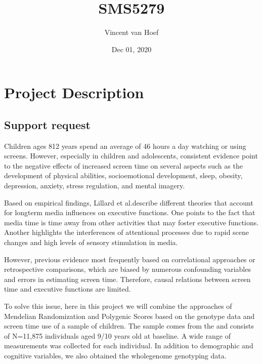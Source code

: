 \documentclass[letterpaper,10pt,english]{sphinxmanual}
\title{SMS5279}
\date{Dec 01, 2020}
\author{Vincent van Hoef}
\begin{document}
\pagestyle{empty}
\sphinxmaketitle
\pagestyle{plain}
\sphinxtableofcontents
\pagestyle{normal}
\label{\detokenize{index::doc}}


\begin{DUlineblock}{0em}
\item[] 
\end{DUlineblock}




\chapter{Project Description}
\label{\detokenize{content/project_description:project-description}}\label{\detokenize{content/project_description::doc}}

\section{Support request}
\label{\detokenize{content/project_description:support-request}}
Children ages 8\sphinxhyphen{}12 years spend an average of 4\sphinxhyphen{}6 hours a day watching or using screens. However, especially in children and adolescents, consistent evidence point to the negative effects of increased screen time on several aspects such as the development of physical abilities, socio\sphinxhyphen{}emotional development, sleep, obesity, depression, anxiety, stress regulation, and mental imagery.

Based on empirical findings, Lillard et al.describe different theories that account for long\sphinxhyphen{}term media influences on executive functions. One points to the fact that media time is time away from other activities that may foster executive functions. Another highlights the interferences of attentional processes due to rapid scene changes and high levels of sensory stimulation in media.

However, previous evidence most frequently based on correlational approaches or retrospective comparisons, which are biased by numerous confounding variables and errors in estimating screen time. Therefore, causal relations between screen time and executive functions are limited.

To solve this issue, here in this project we will combine the approaches of Mendelian Randomization and Polygenic Scores based on the genotype data and screen time use of a sample of children. The sample comes from the  and consists of N=11,875 individuals aged 9/10 years old at baseline. A wide range of measurements was collected for each individual. In addition to demographic and cognitive variables, we also obtained the whole\sphinxhyphen{}genome genotyping data.
\end{document}
